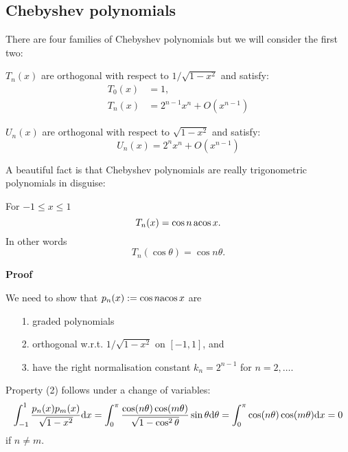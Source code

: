 \subsection{Chebyshev polynomials}
There are four families of Chebyshev polynomials but we will consider the first two:

\begin{definition} $T_n(x)$ are orthogonal with respect to $1/\sqrt{1-x^2}$ and satisfy:
\begin{align*}
T_0(x) &= 1, \\
T_n(x) &= 2^{n-1} x^n + O(x^{n-1})
\end{align*}
\end{definition}

\begin{definition} $U_n(x)$ are orthogonal with respect to $\sqrt{1-x^2}$ and satisfy:
\[
U_n(x) = 2^n x^n + O(x^{n-1})
\]
\end{definition}

A beautiful fact is that Chebyshev polynomials are really trigonometric polynomials in disguise:

\begin{theorem} For $-1 \ensuremath{\leq} x \ensuremath{\leq} 1$
\[
T_n(x) = \cos n\, {\rm acos}\, x.
\]
In other words
\[
T_n(\cos \ensuremath{\theta}) = \cos n \ensuremath{\theta}.
\]
\end{theorem}
\textbf{Proof}

We need to show that $p_n(x) := \cos n {\rm acos}\, x$ are

\begin{itemize}
\item[1. ] graded polynomials


\item[2. ] orthogonal w.r.t. $1/\sqrt{1-x^2}$ on $[-1,1]$, and


\item[3. ] have the right normalisation constant $k_n = 2^{n-1}$ for $n = 2,\ensuremath{\ldots}$.

\end{itemize}
Property (2) follows under a change of variables:
\[
\int_{-1}^1 {p_n(x) p_m(x) \over \sqrt{1-x^2}} {\rm d} x =
\int_0^\ensuremath{\pi} {\cos(n\ensuremath{\theta}) \cos(m\ensuremath{\theta}) \over \sqrt{1-\cos^2 \ensuremath{\theta}}} \sin \ensuremath{\theta} {\rm d} \ensuremath{\theta} =
\int_0^\ensuremath{\pi} \cos(n\ensuremath{\theta}) \cos(m\ensuremath{\theta}) {\rm d} x = 0
\]
if $n \ensuremath{\neq} m$.

